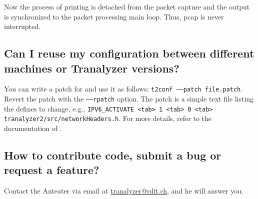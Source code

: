 \documentclass[documentation]{subfiles}
\begin{document}
Now the process of printing is detached from the packet capture and the output is synchronized to the packet processing main loop.
Thus, pcap is never interrupted.\\


\subsection{Can I reuse my configuration between different machines or Tranalyzer versions?}
You can write a patch for  and use it as follows: {\tt t2conf --{}--patch file.patch}.
Revert the patch with the {\tt --{}--rpatch} option.
The patch is a simple text file listing the defines to change, e.g., {\tt IPV6\_ACTIVATE <tab> 1 <tab> 0 <tab> tranalyzer2/src/networkHeaders.h}.
For more details, refer to the documentation of .

\subsection{How to contribute code, submit a bug or request a feature?}
Contact the Anteater via email at \href{mailto:tranalyzer@rdit.ch}{tranalyzer@rdit.ch}, and he will answer you.
\end{document}
